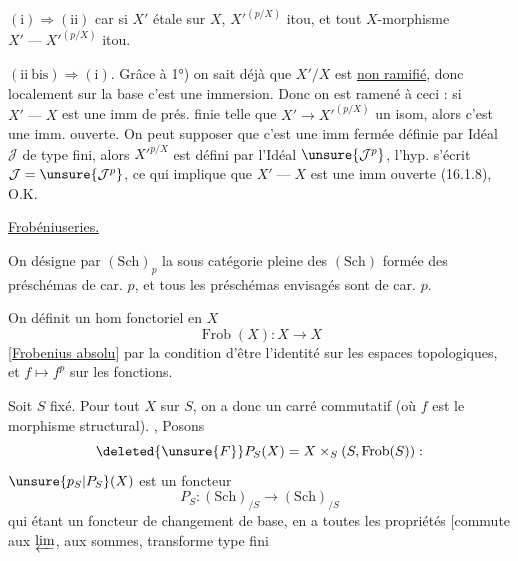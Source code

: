 $(\mathrm{i})\Longrightarrow(\mathrm{ii})$ car si $X'$ étale sur $X$, $X'^{(p/X)}$ itou, et
tout $X$-morphisme $X'\mathbin{\text{---}}X'^{(p/X)}$ itou.

$(\mathrm{ii\ bis})\Longrightarrow(\mathrm{i})$. Grâce à 1°) on sait déjà que $X'/X$
est \uline{non ramifié}, donc localement  sur la base
 c'est une immersion. Donc
on est ramené à ceci : si $X'\mathbin{\text{---}}X$ est
une imm de prés. finie telle que
$X'\longrightarrow X'^{(p/X)}$ un isom, alors c'est une imm.
ouverte. On peut supposer que c'est
une imm fermée définie par Idéal $\mathcal J$
de type fini, alors $X'^{p/X}$ est défini
par l'Idéal $\unsure{\mathcal J^p}$, l'hyp. s'écrit $\mathcal J=\unsure{\mathcal J^p}$,
ce qui implique que  $X'\mathbin{\text{---}}X$ est
une imm ouverte (16.1.8), O.K.

\uline{Frobéniuseries.}

On désigne par $(\mathrm{Sch})_p$  la sous catégorie pleine des $(\mathrm{Sch})$
formée des préschémas de car. $p$, et tous les préschémas
envisagés sont de car. $p$.

On définit un hom fonctoriel en $X$
\[
\operatorname{Frob}(X):X\longrightarrow X
\]
[\uline{Frobenius absolu}] par la condition d'être l'identité
sur les espaces topologiques, et $f\mapsto f^p$ sur les
fonctions.

Soit $S$ fixé. Pour tout $X$ sur $S$, on a donc
un carré commutatif
(où $f$ est le morphisme structural). , Posons
\[
\deleted{\unsure{F}}P_S(X)=X\times_S(S,\operatorname{Frob}(S)):
\]
$\unsure{p_S|P_S}(X)$ est un foncteur
\[
P_S:(\mathrm{Sch})_{/S}\longrightarrow(\mathrm{Sch})_{/S}
\]
qui étant un foncteur de changement de base, en
a toutes les propriétés [commute aux
$\varprojlim$, aux sommes, transforme type fini

